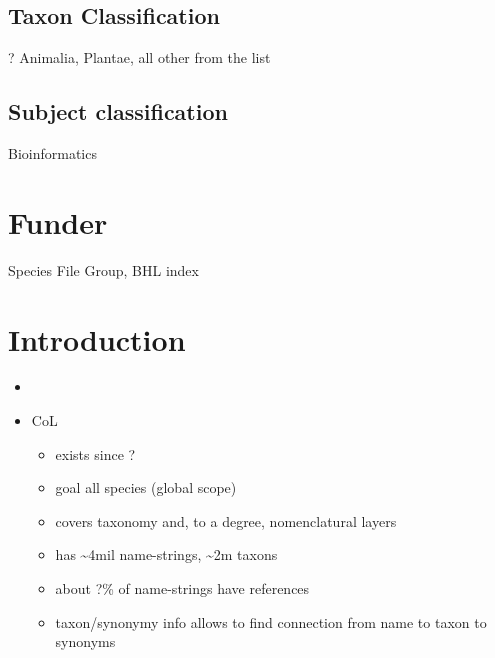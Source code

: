 \documentclass[
]{article}
\providecommand{\tightlist}{%
  \setlength{\itemsep}{0pt}\setlength{\parskip}{0pt}}
\begin{document}
\hypertarget{taxon-classification}{%
\subsection{Taxon Classification}\label{taxon-classification}}

? Animalia, Plantae, all other from the list

\hypertarget{subject-classification}{%
\subsection{Subject classification}\label{subject-classification}}

Bioinformatics

\hypertarget{funder}{%
\section{Funder}\label{funder}}

Species File Group, BHL index

\hypertarget{introduction}{%
\section{Introduction}\label{introduction}}

\begin{itemize}
\item
\item
  CoL

  \begin{itemize}
  \tightlist
  \item
    exists since ?
  \item
    goal all species (global scope)
  \item
    covers taxonomy and, to a degree, nomenclatural layers
  \item
    has \textasciitilde4mil name-strings, \textasciitilde2m taxons
  \item
    about ?\% of name-strings have references
  \item
    taxon/synonymy info allows to find connection from name to taxon to
    synonyms
  \end{itemize}
\end{itemize}
\end{document}
